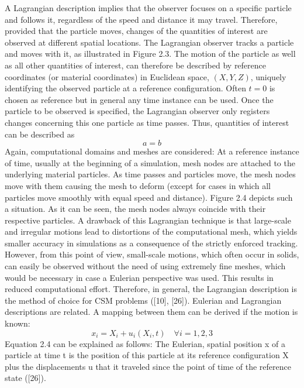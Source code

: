 A Lagrangian description implies that the observer focuses on a specific particle and follows it, regardless of the speed and distance it may travel. Therefore, provided that the particle moves, changes of the quantities of interest are observed at different spatial locations. The Lagrangian observer tracks a particle and moves with it, as illustrated in Figure 2.3.
The motion of the particle as well as all other quantities of interest, can therefore be described by
reference coordinates (or material coordinates) in Euclidean space, $(X, Y, Z)$, uniquely identifying the
observed particle at a reference configuration. Often $t = 0$ is chosen as reference but in general any time
instance can be used. Once the particle to be observed is specified, the Lagrangian observer only registers changes concerning this one particle as time passes. Thus, quantities of interest can be described as
\begin{equation}
a = b
\end{equation}
Again, computational domains and meshes are considered: At a reference instance of time, usually at the
beginning of a simulation, mesh nodes are attached to the underlying material particles. As time passes
and particles move, the mesh nodes move with them causing the mesh to deform (except for cases in
which all particles move smoothly with equal speed and distance). Figure 2.4 depicts such a situation.
As it can be seen, the mesh nodes always coincide with their respective particles. A drawback of this
Lagrangian technique is that large-scale and irregular motions lead to distortions of the computational
mesh, which yields smaller accuracy in simulations as a consequence of the strictly enforced tracking.
However, from this point of view, small-scale motions, which often occur in solids, can easily be observed
without the need of using extremely fine meshes, which would be necessary in case a Eulerian perspective
was used. This results in reduced computational effort. Therefore, in general, the Lagrangian description
is the method of choice for CSM problems ([10], [26]).
Eulerian and Lagrangian descriptions are related. A mapping between them can be derived if the motion
is known:
\begin{equation}
x_i = X_i + u_i(X_i, t) \quad \forall i = 1, 2, 3
\end{equation}
Equation 2.4 can be explained as follows: The Eulerian, spatial position x of a particle at time t is the
position of this particle at its reference configuration X plus the displacements u that it traveled since
the point of time of the reference state ([26]).

